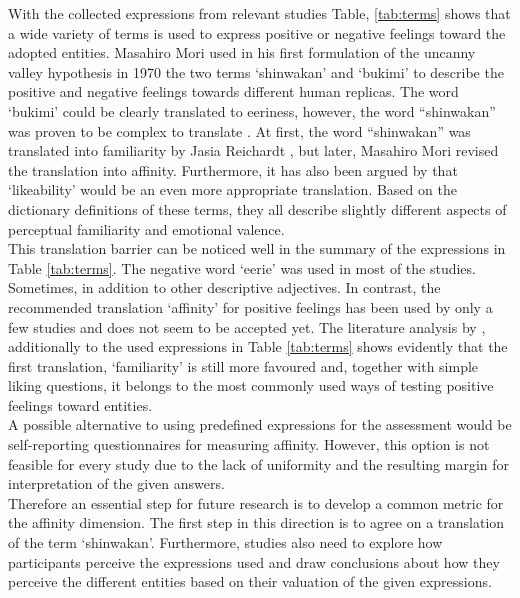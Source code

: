 With the collected expressions from relevant studies Table, \ref{tab:terms} shows that a wide variety of terms is used to express positive or negative feelings toward the adopted entities. Masahiro Mori used in his first formulation of the uncanny valley hypothesis in 1970  \cite{original_masahiro_not_translated} the two terms `shinwakan' and `bukimi' to describe the positive and negative feelings towards different human replicas. The word `bukimi' could be clearly translated to eeriness, however, the word “shinwakan” was proven to be complex to translate \cite{quant_review}. At first, the word “shinwakan” was translated into familiarity by Jasia Reichardt \cite{first_translation}, but later, Masahiro Mori revised the translation into affinity. Furthermore, it has also been argued by \cite{uncanny_cliff} that `likeability' would be an even more appropriate translation. Based on the dictionary definitions of these terms, they all describe slightly different aspects of perceptual familiarity and emotional valence.\\
This translation barrier can be noticed well in the summary of the expressions in Table \ref{tab:terms}. The negative word `eerie' was used in most of the studies. Sometimes, in addition to other descriptive adjectives. In contrast, the recommended translation `affinity' for positive feelings has been used by only a few studies and does not seem to be accepted yet. The literature analysis by \cite{quant_review}, additionally to the used expressions in Table \ref{tab:terms} shows evidently that the first translation, `familiarity' is still more favoured and, together with simple liking questions, it belongs to the most commonly used ways of testing positive feelings toward entities.\\
A possible alternative to using predefined expressions for the assessment would be self-reporting questionnaires for measuring affinity. However, this option is not feasible for every study due to the lack of uniformity and the resulting margin for interpretation of the given answers.\\
Therefore an essential step for future research is to develop a common metric for the affinity dimension. The first step in this direction is to agree on a translation of the term `shinwakan'. Furthermore, studies also need to explore how participants perceive the expressions used and draw conclusions about how they perceive the different entities based on their valuation of the given expressions. 
\newpage

